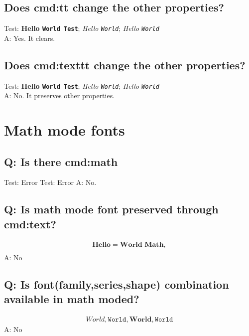 \documentclass[11pt]{revtex4-1}
\begin{document}
\subsection*{Does cmd:tt change the other properties?}
Test: {\bfseries Hello \tt World \rmfamily Test}; {\slshape Hello \tt World}; {\itshape Hello \tt World} \\
A: Yes. It clears.

\subsection*{Does cmd:texttt change the other properties?}
Test: {\bfseries Hello \texttt{World \rmfamily Test}}; {\slshape Hello \texttt{World}}; {\itshape Hello \texttt{World}} \\
A: No. It preserves other properties.

\section{Math mode fonts}
\subsection*{Q: Is there cmd:math}
Test: Error %
Test: Error %
A: No.

\subsection*{Q: Is math mode font preserved through cmd:text?}
\begin{align}
  \mathbf{Hello = \text{World $Math$}}, \\
\end{align}
A: No

\subsection*{Q: Is font(family,series,shape) combination available in math moded?}
\begin{align}
  World,\mathtt{World,\mathbf{World,\mathtt{World}}}
\end{align}
A: No
\end{document}
